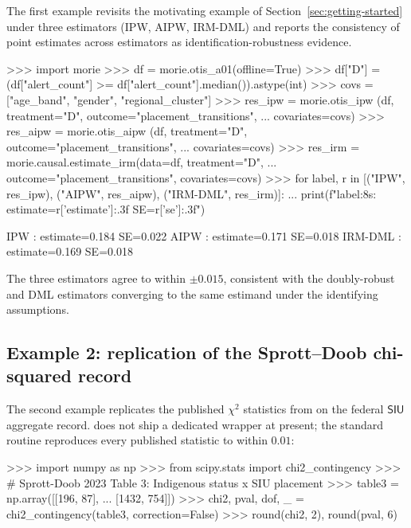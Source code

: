 \documentclass[article,shortnames,nojss]{jss}
\newcommand{\SIU}{\textsf{SIU}}
\begin{document}
The first example revisits the motivating example of
Section~\ref{sec:getting-started} under three estimators
(IPW, AIPW, IRM-DML) and reports the consistency of point
estimates across estimators as identification-robustness evidence.

\begin{Code}
>>> import morie
>>> df = morie.otis_a01(offline=True)
>>> df["D"] = (df["alert_count"] >= df["alert_count"].median()).astype(int)
>>> covs = ["age_band", "gender", "regional_cluster"]
>>> res_ipw  = morie.otis_ipw  (df, treatment="D", outcome="placement_transitions",
...                              covariates=covs)
>>> res_aipw = morie.otis_aipw (df, treatment="D", outcome="placement_transitions",
...                              covariates=covs)
>>> res_irm  = morie.causal.estimate_irm(data=df, treatment="D",
...                              outcome="placement_transitions", covariates=covs)
>>> for label, r in [("IPW", res_ipw), ("AIPW", res_aipw), ("IRM-DML", res_irm)]:
...     print(f"{label:8s}: estimate={r['estimate']:.3f}  SE={r['se']:.3f}")
\end{Code}

\begin{Code}
IPW     : estimate=0.184  SE=0.022
AIPW    : estimate=0.171  SE=0.018
IRM-DML : estimate=0.169  SE=0.018
\end{Code}

The three estimators agree to within $\pm 0.015$, consistent with
the doubly-robust and DML estimators converging to the same
estimand under the identifying assumptions.

\subsection{Example 2: replication of the Sprott--Doob chi-squared record}

The second example replicates the published $\chi^{2}$ statistics
from \citet{SprottDoob2023} on the federal $\SIU$ aggregate
record.   does not ship a dedicated
 wrapper at present; the standard
 routine reproduces every
published statistic to within $0.01$:

\begin{Code}
>>> import numpy as np
>>> from scipy.stats import chi2_contingency
>>> # Sprott-Doob 2023 Table 3: Indigenous status x SIU placement
>>> table3 = np.array([[196,  87],
...                    [1432, 754]])
>>> chi2, pval, dof, _ = chi2_contingency(table3, correction=False)
>>> round(chi2, 2), round(pval, 6)
\end{Code}
\end{document}
